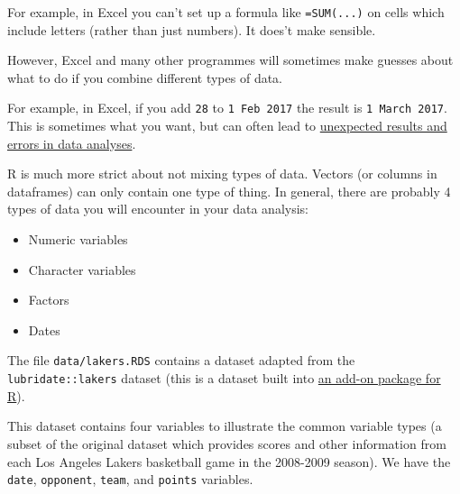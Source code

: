 \documentclass[]{article}
\providecommand{\tightlist}{%
  \setlength{\itemsep}{0pt}\setlength{\parskip}{0pt}}
\begin{document}
For example, in Excel you can't set up a formula like \texttt{=SUM(...)} on cells which include letters (rather than just numbers). It does't make sensible.

However, Excel and many other programmes will sometimes make guesses about what to do if you combine different types of data.

For example, in Excel, if you add \texttt{28} to \texttt{1\ Feb\ 2017} the result is \texttt{1\ March\ 2017}. This is sometimes what you want, but can often lead to \href{http://www.sciencemag.org/news/sifter/one-five-genetics-papers-contains-errors-thanks-microsoft-excel}{unexpected results and errors in data analyses}.

R is much more strict about not mixing types of data. Vectors (or columns in dataframes) can only contain one type of thing. In general, there are probably 4 types of data you will encounter in your data analysis:

\begin{itemize}
\tightlist
\item
  Numeric variables
\item
  Character variables
\item
  Factors
\item
  Dates
\end{itemize}

The file \texttt{data/lakers.RDS} contains a dataset adapted from the \texttt{lubridate::lakers} dataset (this is a dataset built into \protect\hyperlink{packages}{an add-on package for R}).

This dataset contains four variables to illustrate the common variable types (a subset of the original dataset which provides scores and other information from each Los Angeles Lakers basketball game in the 2008-2009 season). We have the \texttt{date}, \texttt{opponent}, \texttt{team}, and \texttt{points} variables.
\end{document}
